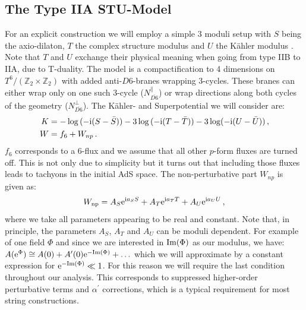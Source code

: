 \documentclass[a4paper,12pt,twoside,openright]{report}
\newcommand{\be}{\begin{equation}}
\newcommand{\ee}{\end{equation}}
\newcommand{\bea}{\begin{equation}\begin{aligned}}
\newcommand{\eea}{\end{aligned}\end{equation}}
\def\rmi{{\rm i}}
\def\rme{{\rm e}}
\def\rmim{{\rm Im}}
\begin{document}
\subsection{The Type IIA STU-Model}
\label{sec:antibraneupSTU}
For an explicit construction we will employ a simple 3 moduli setup with $S$ being the axio-dilaton, $T$ the complex structure modulus and $U$ the Kähler modulus \cite{Dibitetto:2011gm,Danielsson:2013rza}. Note that $T$ and $U$ exchange their physical meaning when going from type IIB to IIA, due to T-duality. %
The model is a compactification to 4 dimensions on $T^6/(\mathbb{Z}_2 \times \mathbb{Z}_2)$ with added anti-$D6$-branes wrapping 3-cycles. These branes can either wrap only on one such 3-cycle ($N_{\overline{D6}}^\parallel$) or wrap directions along both cycles of the geometry ($N_{\overline{D6}}^\perp$). The Kähler- and Superpotential we will consider are:
\bea
K &= -\log{(-\rmi (S- \bar{S}))} - 3\log{(-\rmi (T- \bar{T}))} - 3\log(-\rmi (U- \bar{U}))\,,\\
W &= f_6 + W_{np}\,.
\eea
$f_6$ corresponds to a 6-flux and we assume that all other $p$-form fluxes are turned off. This is not only due to simplicity but it turns out that including those fluxes leads to tachyons in the initial AdS space. The non-perturbative part $W_{np}$ is given as:
\be 
W_{\text{np}} = A_S \rme^{\rmi a_S S} + A_T \rme^{\rmi a_T T} + A_U \rme^{\rmi a_U U}\,,
\label{eq:Wnonpert}
\ee
where we take all parameters appearing to be real and constant. Note that, in principle, the parameters $A_S$, $A_T$ and $A_U$ can be moduli dependent. For example of one field $\Phi$ and since we are interested in $\rmim(\Phi)$ as our modulus, we have: $A(\rme^\Phi) \cong A(0) + A^\prime (0) \rme^{-\rmim (\Phi)} + \ldots$ which we will approximate by a constant expression for $\rme^{-\rmim ( \Phi)}\ll 1$. For this reason we will require the last condition throughout our analysis. This corresponds to suppressed higher-order perturbative terms and $\alpha^\prime$ corrections, which is a typical requirement for most string constructions. \\
\end{document}
